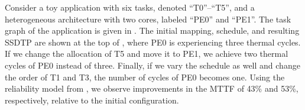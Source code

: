 Consider a toy application with six tasks, denoted ``T0''--``T5'', and a heterogeneous architecture with two cores, labeled ``PE0'' and ``PE1''. The task graph of the application is given in . The initial mapping, schedule, and resulting SSDTP are shown at the top of , where PE0 is experiencing three thermal cycles. If we change the allocation of T5 and move it to PE1, we achieve two thermal cycles of PE0 instead of three. Finally, if we vary the schedule as well and change the order of T1 and T3, the number of cycles of PE0 becomes one. Using the reliability model from , we observe improvements in the MTTF of 43\% and 53\%, respectively, relative to the initial configuration.
